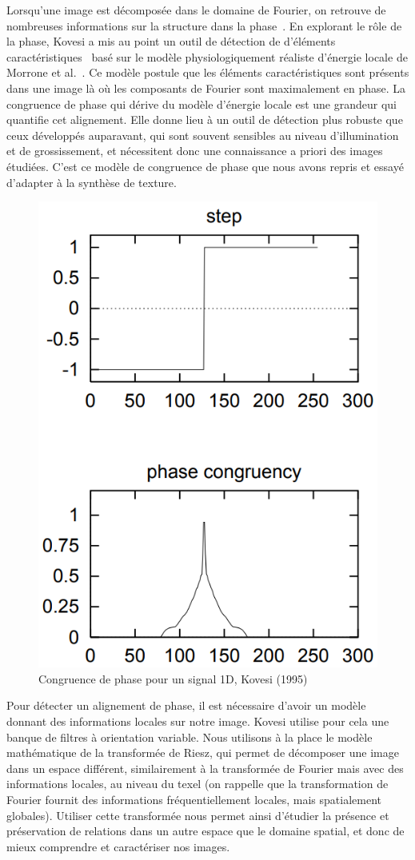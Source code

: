 \bigskip

Lorsqu'une image est décomposée dans le domaine de Fourier, on retrouve de nombreuses informations sur la structure dans la phase~\cite{oppenheim_importance_1981}. En explorant le rôle de la phase, Kovesi a mis au point un outil de détection de d'éléments caractéristiques~\cite{kovesi_image_1995} basé sur le modèle physiologiquement réaliste d'énergie locale de Morrone et al.~\cite{morrone_feature_1987, morrone_feature_1988}. Ce modèle postule que les éléments caractéristiques sont présents dans une image là où les composants de Fourier sont maximalement en phase. La congruence de phase qui dérive du modèle d'énergie locale est une grandeur qui quantifie cet alignement. Elle donne lieu à un outil de détection plus robuste que ceux développés auparavant, qui sont souvent sensibles au niveau d'illumination et de grossissement, et nécessitent donc une connaissance a priori des images étudiées. C'est ce modèle de congruence de phase que nous avons repris et essayé d'adapter à la synthèse de texture.

\bigskip

\begin{figure}[h]
    \centering
    \includegraphics[width=.35\linewidth]{contenu/resources/images/pc_1d_kovesi}
    \caption[Congruence de phase pour un signal 1D]{Congruence de phase pour un signal 1D, Kovesi (1995)~\cite{kovesi_image_1995}}
    \label{fig:pc_1d_kovesi}
\end{figure}

Pour détecter un alignement de phase, il est nécessaire d'avoir un modèle donnant des informations locales sur notre image. Kovesi utilise pour cela une banque de filtres à orientation variable. Nous utilisons à la place le modèle mathématique de la transformée de Riesz, qui permet de décomposer une image dans un espace différent, similairement à la transformée de Fourier mais avec des informations locales, au niveau du texel (on rappelle que la transformation de Fourier fournit des informations fréquentiellement locales, mais spatialement globales). Utiliser cette transformée nous permet ainsi d'étudier la présence et préservation de relations dans un autre espace que le domaine spatial, et donc de mieux comprendre et caractériser nos images.

